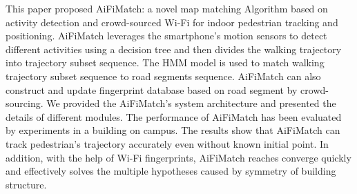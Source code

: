 \documentclass[conference]{IEEEtran}
\begin{document}
This paper proposed AiFiMatch: a novel map matching Algorithm based on activity detection and crowd-sourced Wi-Fi for indoor pedestrian tracking and positioning. AiFiMatch leverages the smartphone's motion sensors to detect different activities using a decision tree and then divides the walking trajectory into trajectory subset sequence. The HMM model is used to match walking trajectory subset sequence to road segments sequence.  AiFiMatch can also construct and update fingerprint database based on road segment by crowd-sourcing. We provided the AiFiMatch's system architecture and presented the details of different modules. The performance of AiFiMatch has been evaluated by experiments in a building on campus. The results show that AiFiMatch can track pedestrian's trajectory accurately even without known initial point. In addition, with the help of Wi-Fi fingerprints, AiFiMatch reaches converge quickly and effectively solves the multiple hypotheses caused by symmetry of building structure. 

%
\end{document}
